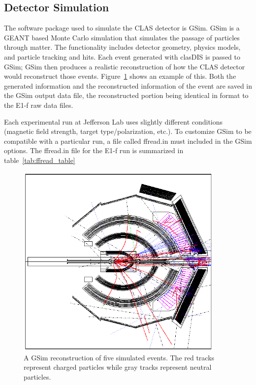 \subsection{Detector Simulation}
\label{subsec:DetectorSimulation}
%
The software package used to simulate the CLAS detector is GSim.
GSim is a GEANT based Monte Carlo simulation that simulates the passage of particles through matter.
The functionality includes detector geometry, physics models, and particle tracking and hits.
Each event generated with clasDIS is passed to GSim; GSim then produces a realistic reconstruction of how the CLAS detector would reconstruct those events.
Figure~\ref{fig:gsim_int_5events} shows an example of this.
Both the generated information and the reconstructed information of the event are saved in the GSim output data file, the reconstructed portion being identical in format to the E1-f raw data files.

Each experimental run at Jefferson Lab uses slightly different conditions (magnetic field strength, target type/polarization, etc.).
To customize GSim to be compatible with a particular run, a file called ffread.in must included in the GSim options.
The ffread.in file for the E1-f run is summarized in table~\ref{tab:ffread_table}
%
\begin{figure}[htp]
\centering
\includegraphics[width=4in]{figures/gsim_int_5events.png}
\caption{A GSim reconstruction of five simulated events. The red tracks represent charged particles while gray tracks represent neutral particles.}
\label{fig:gsim_int_5events}
\end{figure}

